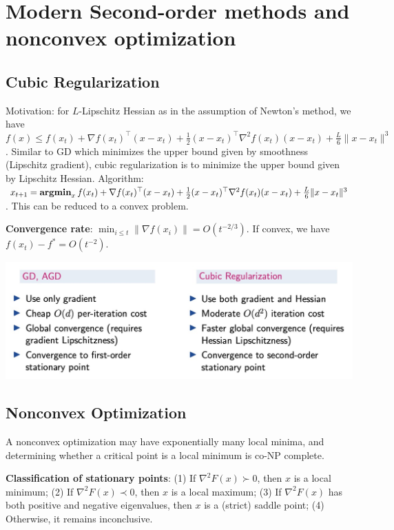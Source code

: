 \section{Modern Second-order methods and nonconvex optimization}

\subsection{Cubic Regularization}

Motivation: for $L$-Lipschitz Hessian as in the assumption of Newton's method, we have $f(x) \le f(x_t) + \nabla f(x_t)^\top (x-x_t) + \frac{1}{2}(x-x_t)^\top \nabla^2 f(x_t) (x- x_t) + \frac{L}{6}\|x-x_t\|^3$. Similar to GD which minimizes the upper bound given by smoothness (Lipschitz gradient), cubic regularization is to minimize the upper bound given by Lipschitz Hessian. Algorithm: $x_{t+1} = \operatorname{\textbf{argmin}}_x f(x_t) + \nabla f(x_t)^\top (x-x_t) + \frac{1}{2}(x-x_t)^\top \nabla^2 f(x_t) (x- x_t) + \frac{L}{6}\|x-x_t\|^3$. This can be reduced to a convex problem.

\textbf{Convergence rate}: $\min_{i\le t} \|\nabla f(x_i)\| = O(t^{-2/3})$. If convex, we have $f(x_t) - f^* = O(t^{-2})$.

\includegraphics[width=\linewidth]{imgs/cubic.jpg}

\subsection{Nonconvex Optimization}

A nonconvex optimization may have exponentially many local minima, and determining whether a critical point is a local minimum is co-NP complete.

\textbf{Classification of stationary points}: (1) If $\nabla^2 F(x) \succ 0$, then $x$ is a local minimum; (2) If $\nabla^2 F(x) \prec 0$, then $x$ is a local maximum; (3) If $\nabla^2 F(x)$ has both positive and negative eigenvalues, then $x$ is a (strict) saddle point; (4) Otherwise, it remains inconclusive.

